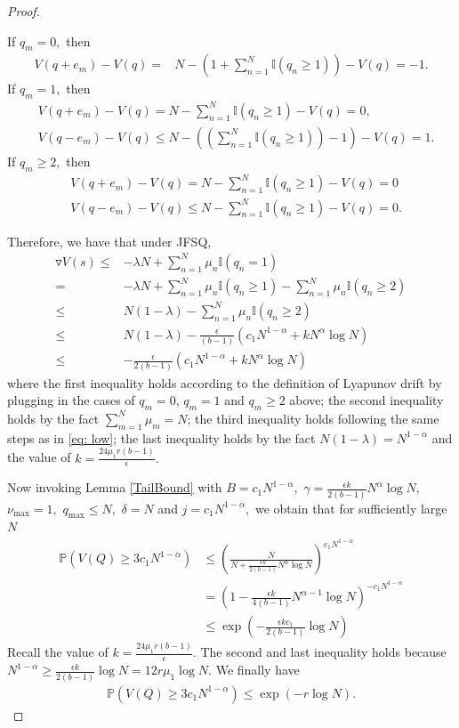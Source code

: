 \documentclass[11pt,oneside,letter]{article}
\begin{document}
\begin{proof}
\begin{itemize}
If $q_m = 0,$ then 
\begin{align*}
V(q+e_m) -V(q) = &N - \left(1+\sum_{n=1}^{N} \mathbb{I}(q_n\geq 1)\right)-V(q)=-1.
\end{align*} 
If $q_m = 1,$ then 
\begin{align*}
&V(q+e_m)-V(q) = N -\sum_{n=1}^{ N} \mathbb{I}(q_n\geq 1)-V(q)=0,\\
&V(q-e_m) -V(q)\leq N   - \left(\left(\sum_{n=1}^{N} \mathbb{I}(q_n\geq 1)\right)-1\right)-V(q)=1.
\end{align*} 
If $q_m \geq 2,$ then 
\begin{align*}
&V(q+e_m)-V(q)  = N   - \sum_{n=1}^{N} \mathbb{I}(q_n\geq 1)-V(q)=0\\
&V(q-e_m) -V(q)\leq N  - \sum_{n=1}^{N} \mathbb{I}(q_n\geq 1)-V(q)=0.
\end{align*} 

Therefore, we have that under JFSQ, 
\begin{align*}
\triangledown V(s)\leq&-\lambda N + \sum_{n=1}^{N} \mu_n\mathbb{I}(q_n=1)\\
=&-\lambda N + \sum_{n=1}^{N} \mu_n\mathbb{I}(q_n\geq 1)-\sum_{n=1}^{N} \mu_n\mathbb{I}(q_n\geq 2)\\
\leq & N(1-\lambda)-\sum_{n=1}^{N} \mu_n\mathbb{I}(q_n\geq 2)\\
\leq& N(1-\lambda) - \frac{\epsilon }{(b-1)} (c_1 N^{1-\alpha} + k N^{\alpha}\log N) \\
\leq&  - \frac{\epsilon }{2(b-1)} (c_1 N^{1-\alpha} + k N^{\alpha}\log N)
\end{align*}
where the first inequality holds according to the definition of Lyapunov drift by plugging in the cases of $q_m=0$, $q_m=1$ and $q_m\geq 2$ above; the second inequality holds by the fact $\sum_{m=1}^{N} \mu_m = N$; the third inequality holds following the same steps as in \eqref{eq: low}; the last inequality holds by the fact $N(1-\lambda) = N^{1-\alpha}$ and the value of $k = \frac{24\mu_1r(b-1)}{\epsilon}.$ 
\end{itemize}

Now invoking Lemma \ref{TailBound} with $B=c_1N^{1-\alpha},$ $\gamma= \frac{\epsilon k}{2(b-1)} N^{\alpha}\log N,$ $\nu_{\max}=1,$ $q_{\max}\leq N,$ $\delta=N$ and $j= c_1 N^{1-\alpha},$ we obtain that for sufficiently large $N$
\begin{align*}
  \mathbb P\left(V(Q)\geq 3c_1  N^{1-\alpha}\right)
   &\leq \left(\frac{N}{N+\frac{\epsilon k}{2(b-1)} N^{\alpha}\log N}\right)^{c_1 N^{1-\alpha}} \\
   &= \left(1 - \frac{\epsilon k}{4(b-1)} N^{\alpha - 1} \log N \right)^{-c_1 N^{1-\alpha}} \\
   &\leq \exp\left(- \frac{\epsilon k c_1}{2(b-1)} \log N\right)
\end{align*}
Recall the value of $k = \frac{24\mu_1r(b-1)}{\epsilon}.$ The second and last inequality holds because $N^{1-\alpha} \geq \frac{\epsilon k}{2(b-1)}  \log N = 12 r \mu_1  \log N.$ We finally have
\begin{align*}
  \mathbb P\left(V(Q)\geq 3c_1  N^{1-\alpha}\right)
   \leq  \exp\left(-r \log N\right).
\end{align*}
\end{proof}
\end{document}
